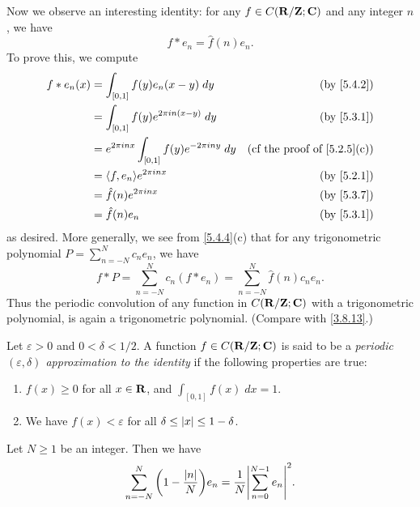 \begin{additional corollary}\label{ac 5.4.1}
Now we observe an interesting identity:
for any \(f \in C(\mathbf{R} / \mathbf{Z} ; \mathbf{C})\) and any integer \(n\), we have
\[
  f * e_n = \hat{f}(n) e_n.
\]
To prove this, we compute
\begin{align*}
  f * e_n(x) & = \int_{[0, 1]} f(y) e_n(x - y) \; dy                        & \text{(by \cref{5.4.2})}                 \\
             & = \int_{[0, 1]} f(y) e^{2 \pi i n (x - y)} \; dy             & \text{(by \cref{5.3.1})}                 \\
             & = e^{2 \pi i n x} \int_{[0, 1]} f(y) e^{- 2 \pi i n y} \; dy & \text{(cf the proof of \cref{5.2.5}(c))} \\
             & = \inner*{f, e_n} e^{2 \pi i n x}                            & \text{(by \cref{5.2.1})}                 \\
             & = \hat{f}(n) e^{2 \pi i n x}                                 & \text{(by \cref{5.3.7})}                 \\
             & = \hat{f}(n) e_n                                             & \text{(by \cref{5.3.1})}
\end{align*}
as desired.
More generally, we see from \cref{5.4.4}(c) that for any trigonometric polynomial \(P = \sum_{n = -N}^N c_n e_n\), we have
\[
  f * P = \sum_{n = -N}^N c_n (f * e_n) = \sum_{n = -N}^N \hat{f}(n) c_n e_n.
\]
Thus the periodic convolution of any function in \(C(\mathbf{R} / \mathbf{Z} ; \mathbf{C})\) with a trigonometric polynomial, is again a trigonometric polynomial.
(Compare with \cref{3.8.13}.)
\end{additional corollary}

\begin{definition}\label{5.4.5}
  Let \(\varepsilon > 0\) and \(0 < \delta < 1 / 2\).
  A function \(f \in C(\mathbf{R} / \mathbf{Z} ; \mathbf{C})\) is said to be a \emph{periodic \((\varepsilon, \delta)\) approximation to the identity} if the following properties are true:
  \begin{enumerate}
    \item \(f(x) \geq 0\) for all \(x \in \mathbf{R}\), and \(\int_{[0, 1]} f(x) \; dx = 1\).
    \item We have \(f(x) < \varepsilon\) for all \(\delta \leq \left\lvert x\right\rvert \leq 1 - \delta\).
  \end{enumerate}
\end{definition}

\begin{additional corollary}\label{ac 5.4.2}
Let \(N \geq 1\) be an integer.
Then we have
\[
  \sum_{n = -N}^N \bigg(1 - \frac{\abs{n}}{N}\bigg) e_n = \frac{1}{N} \abs{\sum_{n = 0}^{N - 1} e_n}^2.
\]
\end{additional corollary}

